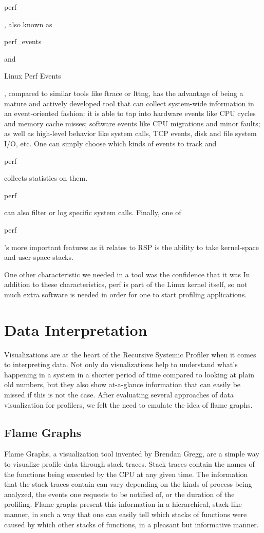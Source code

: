 \documentclass[10pt]{article}
\begin{document}
\begin{tt}perf\end{tt}, also known as \begin{tt}perf\_events\end{tt} and \begin{tt}Linux Perf Events\end{tt}, compared to similar tools like ftrace or lttng, has the advantage of being a mature and actively developed tool that can collect system-wide information in an event-oriented fashion: it is able to tap into hardware events like CPU cycles and memory cache misses; software events like CPU migrations and minor faults; as well as high-level behavior like system calls, TCP events, disk and file system I/O, etc. One can simply choose which kinds of events to track and \begin{tt}perf\end{tt} collects statistics on them. \begin{tt}perf\end{tt} can also filter or log specific system calls. Finally, one of \begin{tt}perf\end{tt}'s more important features as it relates to RSP is the ability to take kernel-space and user-space stacks.

One other characteristic we needed in a tool was the confidence that it was  In addition to these characteristics, perf is part of the Linux kernel itself, so not much extra software is needed in order for one to start profiling applications.

\section{Data Interpretation}
Visualizations are at the heart of the Recursive Systemic Profiler when it comes to interpreting data. Not only do visualizations help to understand what's happening in a system in a shorter period of time compared to looking at plain old numbers, but they also show at-a-glance information that can easily be missed if this is not the case. After evaluating several approaches of data visualization for profilers, we felt the need to emulate the idea of flame graphs.

\subsection{Flame Graphs}
Flame Graphs, a visualization tool invented by Brendan Gregg, are a simple way to visualize profile data through stack traces. Stack traces contain the names of the functions being executed by the CPU at any given time. The information that the stack traces contain can vary depending on the kinds of process being analyzed, the events one requests to be notified of, or the duration of the profiling. Flame graphs present this information in a hierarchical, stack-like manner, in such a way that one can easily tell which stacks of functions were caused by which other stacks of functions, in a pleasant but informative manner.
\end{document}
